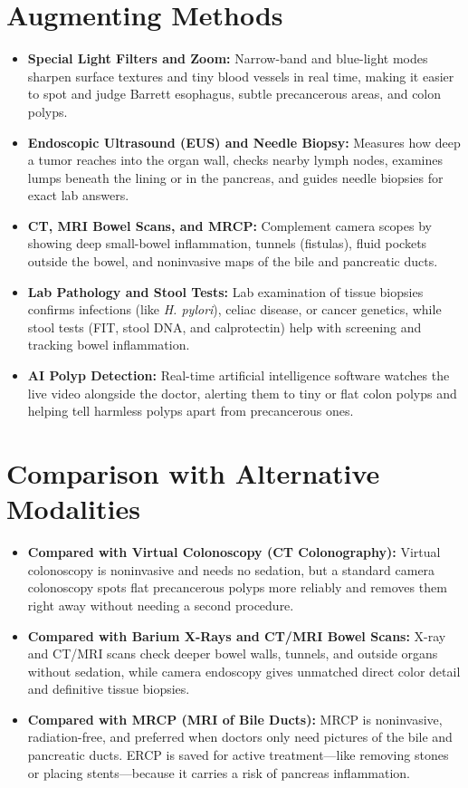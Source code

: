 \section{Augmenting Methods}
\begin{itemize}
\item \textbf{Special Light Filters and Zoom:} Narrow-band and blue-light modes sharpen surface textures and tiny blood vessels in real time, making it easier to spot and judge Barrett esophagus, subtle precancerous areas, and colon polyps.
\item \textbf{Endoscopic Ultrasound (EUS) and Needle Biopsy:} Measures how deep a tumor reaches into the organ wall, checks nearby lymph nodes, examines lumps beneath the lining or in the pancreas, and guides needle biopsies for exact lab answers.
\item \textbf{CT, MRI Bowel Scans, and MRCP:} Complement camera scopes by showing deep small-bowel inflammation, tunnels (fistulas), fluid pockets outside the bowel, and noninvasive maps of the bile and pancreatic ducts.
\item \textbf{Lab Pathology and Stool Tests:} Lab examination of tissue biopsies confirms infections (like \textit{H. pylori}), celiac disease, or cancer genetics, while stool tests (FIT, stool DNA, and calprotectin) help with screening and tracking bowel inflammation.
\item \textbf{AI Polyp Detection:} Real-time artificial intelligence software watches the live video alongside the doctor, alerting them to tiny or flat colon polyps and helping tell harmless polyps apart from precancerous ones.
\end{itemize}


\section{Comparison with Alternative Modalities}
\begin{itemize}
\item \textbf{Compared with Virtual Colonoscopy (CT Colonography):} Virtual colonoscopy is noninvasive and needs no sedation, but a standard camera colonoscopy spots flat precancerous polyps more reliably and removes them right away without needing a second procedure.
\item \textbf{Compared with Barium X-Rays and CT/MRI Bowel Scans:} X-ray and CT/MRI scans check deeper bowel walls, tunnels, and outside organs without sedation, while camera endoscopy gives unmatched direct color detail and definitive tissue biopsies.
\item \textbf{Compared with MRCP (MRI of Bile Ducts):} MRCP is noninvasive, radiation-free, and preferred when doctors only need pictures of the bile and pancreatic ducts. ERCP is saved for active treatment---like removing stones or placing stents---because it carries a risk of pancreas inflammation.
\end{itemize}



